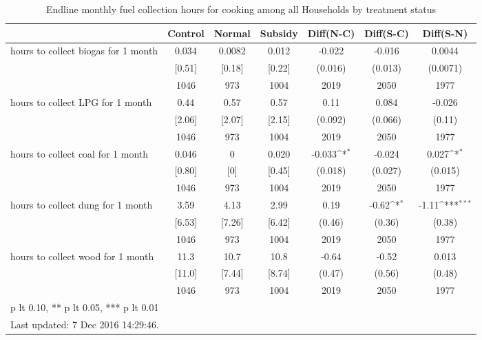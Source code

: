 \begin{table}[htbp]\centering
\def\sym#1{\ifmmode^{#1}\else\(^{#1}\)\fi}
\caption{Endline monthly fuel collection hours for cooking among all Households by treatment status \label{tab:"balance"}}
\begin{tabular*}{1\hsize}{@{\hskip\tabcolsep\extracolsep\fill}l*{1}{cccccc}}
\toprule
                                &  Control&   Normal&  Subsidy&Diff(N-C)         &Diff(S-C)         &Diff(S-N)         \\
\midrule
hours to collect biogas for 1 month&    0.034&   0.0082&    0.012&   -0.022         &   -0.016         &   0.0044         \\
                                &   [0.51]&   [0.18]&   [0.22]&  (0.016)         &  (0.013)         & (0.0071)         \\
                                &     1046&      973&     1004&     2019         &     2050         &     1977         \\
hours to collect LPG for 1 month&     0.44&     0.57&     0.57&     0.11         &    0.084         &   -0.026         \\
                                &   [2.06]&   [2.07]&   [2.15]&  (0.092)         &  (0.066)         &   (0.11)         \\
                                &     1046&      973&     1004&     2019         &     2050         &     1977         \\
hours to collect coal for 1 month&    0.046&        0&    0.020&   -0.033\sym{*}  &   -0.024         &    0.027\sym{*}  \\
                                &   [0.80]&      [0]&   [0.45]&  (0.018)         &  (0.027)         &  (0.015)         \\
                                &     1046&      973&     1004&     2019         &     2050         &     1977         \\
hours to collect dung for 1 month&     3.59&     4.13&     2.99&     0.19         &    -0.62\sym{*}  &    -1.11\sym{***}\\
                                &   [6.53]&   [7.26]&   [6.42]&   (0.46)         &   (0.36)         &   (0.38)         \\
                                &     1046&      973&     1004&     2019         &     2050         &     1977         \\
hours to collect wood for 1 month&     11.3&     10.7&     10.8&    -0.64         &    -0.52         &    0.013         \\
                                &   [11.0]&   [7.44]&   [8.74]&   (0.47)         &   (0.56)         &   (0.48)         \\
                                &     1046&      973&     1004&     2019         &     2050         &     1977         \\
\bottomrule
\multicolumn{7}{l}{\footnotesize * p lt 0.10, ** p lt 0.05, *** p lt 0.01}\\
\multicolumn{7}{l}{\footnotesize Last updated:  7 Dec 2016 14:29:46.}\\
\end{tabular*}
\end{table}
